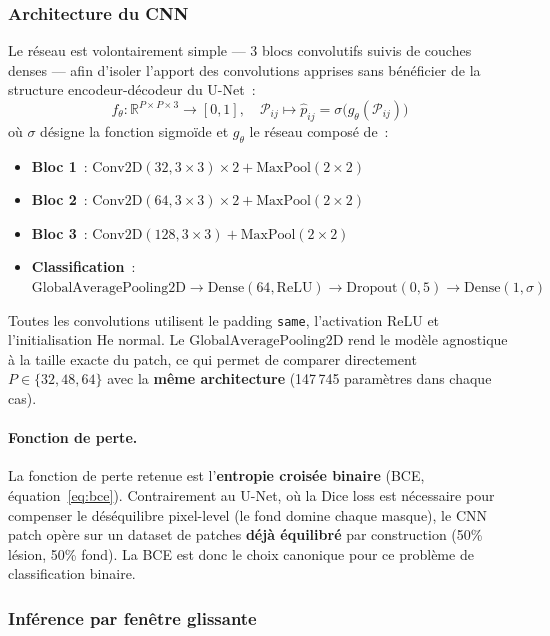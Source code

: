 \documentclass[12pt,a4paper]{article}
\newcommand{\R}{\mathbb{R}}
\begin{document}
\subsubsection{Architecture du CNN}
\label{subsubsec:archi_cnn_patch}

Le réseau est volontairement simple --- 3 blocs convolutifs suivis de couches denses --- afin d'isoler l'apport des convolutions apprises sans bénéficier de la structure encodeur-décodeur du U-Net~:
\begin{equation}
    f_\theta : \R^{P \times P \times 3} \to [0, 1], \quad \mathcal{P}_{ij} \mapsto \hat{p}_{ij} = \sigma\!\big(g_\theta(\mathcal{P}_{ij})\big)
    \label{eq:cnn_patch}
\end{equation}
où $\sigma$ désigne la fonction sigmoïde et $g_\theta$ le réseau composé de~:
\begin{itemize}[nosep]
    \item \textbf{Bloc 1}~: $\text{Conv2D}(32, 3 \times 3) \times 2 + \text{MaxPool}(2 \times 2)$
    \item \textbf{Bloc 2}~: $\text{Conv2D}(64, 3 \times 3) \times 2 + \text{MaxPool}(2 \times 2)$
    \item \textbf{Bloc 3}~: $\text{Conv2D}(128, 3 \times 3) + \text{MaxPool}(2 \times 2)$
    \item \textbf{Classification}~: $\text{GlobalAveragePooling2D} \to \text{Dense}(64, \text{ReLU}) \to \text{Dropout}(0{,}5) \to \text{Dense}(1, \sigma)$
\end{itemize}
Toutes les convolutions utilisent le padding \texttt{same}, l'activation ReLU et l'initialisation He normal. Le $\text{GlobalAveragePooling2D}$ rend le modèle agnostique à la taille exacte du patch, ce qui permet de comparer directement $P \in \{32, 48, 64\}$ avec la \textbf{même architecture} (147\,745 paramètres dans chaque cas).

\paragraph{Fonction de perte.} La fonction de perte retenue est l'\textbf{entropie croisée binaire} (BCE, équation~\ref{eq:bce}). Contrairement au U-Net, où la Dice loss est nécessaire pour compenser le déséquilibre pixel-level (le fond domine chaque masque), le CNN patch opère sur un dataset de patches \textbf{déjà équilibré} par construction (50\% lésion, 50\% fond). La BCE est donc le choix canonique pour ce problème de classification binaire.

\subsubsection{Inférence par fenêtre glissante}
\label{subsubsec:inference_patch}
\end{document}
